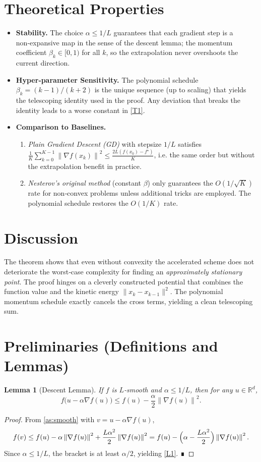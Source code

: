 \documentclass{article}
\newtheorem{lemma}{Lemma}
\newcommand{\norm}[1]{\left\lVert #1\right\rVert}
\begin{document}
\section*{Theoretical Properties}
\begin{itemize}[leftmargin=*]
\item \textbf{Stability.} The choice $\alpha\le1/L$ guarantees that each gradient step is a non‑expansive map in the sense of the descent lemma; the momentum coefficient $\beta_k\in[0,1)$ for all $k$, so the extrapolation never overshoots the current direction.
\item \textbf{Hyper‑parameter Sensitivity.} The polynomial schedule $\beta_k=(k-1)/(k+2)$ is the unique sequence (up to scaling) that yields the telescoping identity used in the proof. Any deviation that breaks the identity leads to a worse constant in \eqref{T1}.
\item \textbf{Comparison to Baselines.}
    \begin{enumerate}
        \item \emph{Plain Gradient Descent (GD)} with stepsize $1/L$ satisfies 
        $\frac{1}{K}\sum_{k=0}^{K-1}\norm{\nabla f(x_k)}^{2}\le \frac{2L(f(x_0)-f^\star)}{K}$, i.e. the same order but without the extrapolation benefit in practice.
        \item \emph{Nesterov’s original method} (constant $\beta$) only guarantees the $O(1/\sqrt{K})$ rate for non‑convex problems unless additional tricks are employed. The polynomial schedule restores the $O(1/K)$ rate.
    \end{enumerate}
\end{itemize}

\section*{Discussion}
The theorem shows that even without convexity the accelerated scheme does not deteriorate the worst‑case complexity for finding an \emph{approximately stationary point}. The proof hinges on a cleverly constructed potential that combines the function value and the kinetic energy $\|x_k-x_{k-1}\|^2$. The polynomial momentum schedule exactly cancels the cross terms, yielding a clean telescoping sum.

\newpage

\section*{Preliminaries (Definitions and Lemmas)}
\begin{lemma}[Descent Lemma]\label{lem:descent}
If $f$ is $L$‑smooth and $\alpha\le 1/L$, then for any $u\in\mathbb{R}^d$,
\[
f\bigl(u-\alpha\nabla f(u)\bigr)\le f(u)-\frac{\alpha}{2}\norm{\nabla f(u)}^{2}.
\tag{L1}
\]
\end{lemma}
\begin{proof}
From \ref{as:smooth} with $v=u-\alpha\nabla f(u)$,
\[
f(v)\le f(u)-\alpha\norm{\nabla f(u)}^{2}
+\frac{L\alpha^{2}}{2}\norm{\nabla f(u)}^{2}
= f(u)-\Bigl(\alpha-\frac{L\alpha^{2}}{2}\Bigr)\norm{\nabla f(u)}^{2}.
\]
Since $\alpha\le 1/L$, the bracket is at least $\alpha/2$, yielding \eqref{L1}. ∎
\end{proof}
\end{document}
